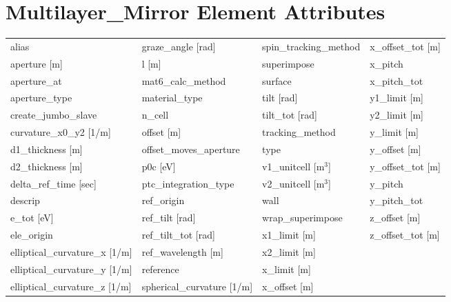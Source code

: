 \section{Multilayer_Mirror Element Attributes}
 \label{s:list.multilayer.mirror}
 
 \begin{tabular}{llll} \toprule
alias                            & graze_angle [rad]                & spin_tracking_method             & x_offset_tot [m]                 \\
aperture [m]                     & l [m]                            & superimpose                      & x_pitch                          \\
aperture_at                      & mat6_calc_method                 & surface                          & x_pitch_tot                      \\
aperture_type                    & material_type                    & tilt [rad]                       & y1_limit [m]                     \\
create_jumbo_slave               & n_cell                           & tilt_tot [rad]                   & y2_limit [m]                     \\
curvature_x0_y2 [1/m]            & offset [m]                       & tracking_method                  & y_limit [m]                      \\
d1_thickness [m]                 & offset_moves_aperture            & type                             & y_offset [m]                     \\
d2_thickness [m]                 & p0c [eV]                         & v1_unitcell [m$^3$]              & y_offset_tot [m]                 \\
delta_ref_time [sec]             & ptc_integration_type             & v2_unitcell [m$^3$]              & y_pitch                          \\
descrip                          & ref_origin                       & wall                             & y_pitch_tot                      \\
e_tot [eV]                       & ref_tilt [rad]                   & wrap_superimpose                 & z_offset [m]                     \\
ele_origin                       & ref_tilt_tot [rad]               & x1_limit [m]                     & z_offset_tot [m]                 \\
elliptical_curvature_x [1/m]     & ref_wavelength [m]               & x2_limit [m]                     &                                  \\
elliptical_curvature_y [1/m]     & reference                        & x_limit [m]                      &                                  \\
elliptical_curvature_z [1/m]     & spherical_curvature [1/m]        & x_offset [m]                     &                                  \\
 \bottomrule
 \end{tabular}
 \vfill
 
